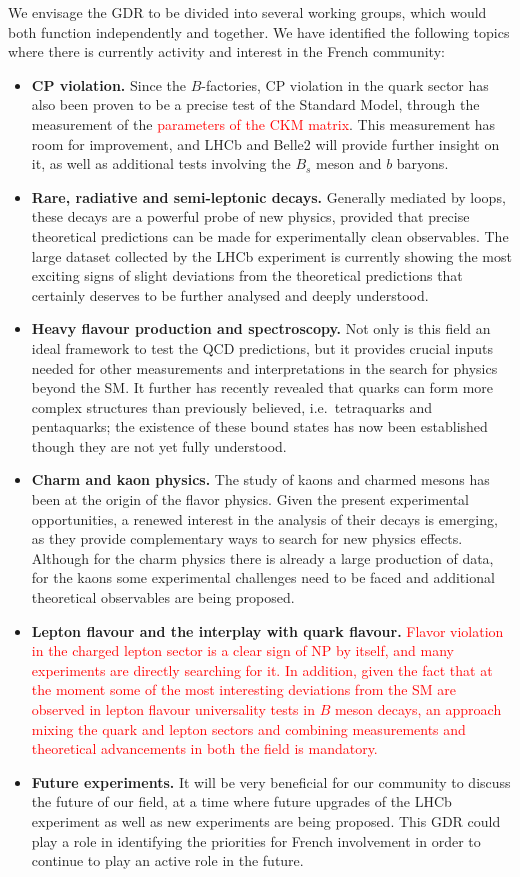 We envisage the GDR to be divided into several working groups, which would both function independently and together. We have identified the following topics where there is currently activity and interest in the French community:
\begin{itemize}
\item {\bf CP violation.}  Since the $B$-factories, CP violation in the quark sector has also been proven to be a precise test of the Standard Model, through the measurement of the \textcolor{red}{parameters of the CKM matrix}. This measurement has room for improvement, and LHCb and Belle2 will provide further insight on it, as well as additional tests involving the  $B_s$ meson and $b$ baryons. 
\item {\bf Rare, radiative and semi-leptonic decays.} Generally mediated by loops, these decays are a powerful probe of new physics, provided that precise theoretical predictions can be made for experimentally clean observables. The large dataset collected by the LHCb experiment is currently showing the most exciting signs of slight deviations from the theoretical predictions that certainly deserves to be further analysed and deeply understood. 
\item {\bf Heavy flavour production and spectroscopy.} Not only is this field an ideal framework to test the QCD predictions, but it provides crucial inputs needed for other measurements and interpretations in the search for physics beyond the SM.  It further has recently revealed that quarks can form more complex structures than previously believed, i.e.~tetraquarks and pentaquarks; the existence of these bound states has now been established though they are not yet fully understood. 
\item {\bf Charm and kaon physics.} The study of kaons and charmed mesons has been at the origin of the flavor physics. Given the present experimental opportunities, a renewed interest in the analysis of their decays is emerging, as they provide complementary ways to search for new physics effects.   Although for the charm physics there is already a large production of data, for the kaons some experimental challenges need to be faced and additional theoretical observables are being proposed.  
\item {\bf Lepton flavour and the interplay with quark flavour. } \textcolor{red}{Flavor violation in the charged lepton sector is a clear sign of NP by itself, and many experiments are directly searching for it. In addition, given the fact that at the moment some of the most interesting deviations from the SM are observed in  lepton flavour universality tests in $B$ meson decays, an approach mixing the quark and lepton sectors and combining measurements and theoretical advancements in both the field is mandatory.}
\item {\bf Future experiments.} It will be very beneficial for our community to discuss the future of our field, at a time where future upgrades of the LHCb experiment as well as new experiments are being proposed. This GDR could play a role in identifying the priorities for French involvement in order to continue to play an active role in the future. 
\end{itemize}
